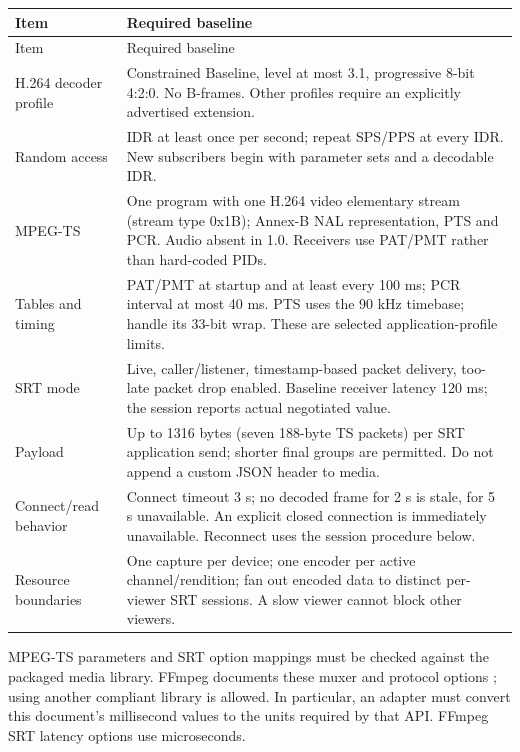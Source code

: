 \begin{longtable}{L{39mm}L{122mm}}
\toprule Item & Required baseline\\\midrule
\endfirsthead
\toprule Item & Required baseline\\\midrule
\endhead
H.264 decoder profile & Constrained Baseline, level at most 3.1, progressive 8-bit 4:2:0. No B-frames. Other profiles require an explicitly advertised extension.\\
Random access & IDR at least once per second; repeat SPS/PPS at every IDR. New subscribers begin with parameter sets and a decodable IDR.\\
MPEG-TS & One program with one H.264 video elementary stream (stream type 0x1B); Annex-B NAL representation, PTS and PCR. Audio absent in 1.0. Receivers use PAT/PMT rather than hard-coded PIDs.\\
Tables and timing & PAT/PMT at startup and at least every 100 ms; PCR interval at most 40 ms. PTS uses the 90 kHz timebase; handle its 33-bit wrap. These are selected application-profile limits.\\
SRT mode & Live, caller/listener, timestamp-based packet delivery, too-late packet drop enabled. Baseline receiver latency 120 ms; the session reports actual negotiated value.\\
Payload & Up to 1316 bytes (seven 188-byte TS packets) per SRT application send; shorter final groups are permitted. Do not append a custom JSON header to media.\\
Connect/read behavior & Connect timeout 3 s; no decoded frame for 2 s is stale, for 5 s unavailable. An explicit closed connection is immediately unavailable. Reconnect uses the session procedure below.\\
Resource boundaries & One capture per device; one encoder per active channel/rendition; fan out encoded data to distinct per-viewer SRT sessions. A slow viewer cannot block other viewers.\\
\bottomrule
\end{longtable}

MPEG-TS parameters and SRT option mappings must be checked against the packaged
media library. FFmpeg documents these muxer and protocol options
\cite{ffmpegformats,ffmpegprotocols}; using another compliant library is allowed.
In particular, an adapter must convert this document's millisecond values to the
units required by that API. FFmpeg SRT latency options use microseconds.

